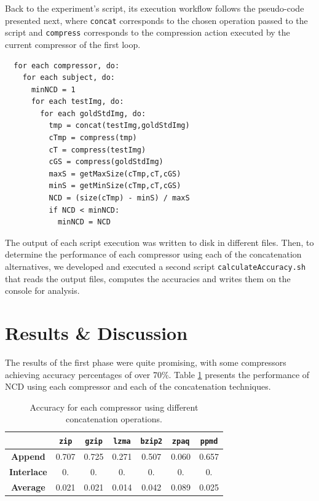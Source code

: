 \documentclass[12pt]{article}
\begin{document}
Back to the experiment's script, its execution workflow follows the pseudo-code presented next, where \texttt{concat} corresponds to the chosen operation passed 
to the script and \texttt{compress} corresponds to the compression action executed by the current compressor of the first loop.

\begin{verbatim}
  for each compressor, do:
    for each subject, do:
      minNCD = 1
      for each testImg, do:
        for each goldStdImg, do:
          tmp = concat(testImg,goldStdImg)
          cTmp = compress(tmp)
          cT = compress(testImg)
          cGS = compress(goldStdImg)
          maxS = getMaxSize(cTmp,cT,cGS)
          minS = getMinSize(cTmp,cT,cGS)
          NCD = (size(cTmp) - minS) / maxS
          if NCD < minNCD:
            minNCD = NCD
\end{verbatim}

\newpage
The output of each script execution was written to disk in different files.
Then, to determine the performance of each compressor using each of the concatenation alternatives, we developed and executed a second script 
\texttt{calculateAccuracy.sh} that reads the output files, computes the accuracies and writes them on the console for analysis. 

\section{Results \& Discussion} %

The results of the first phase were quite promising, with some compressors achieving accuracy percentages of over 70\%.
Table \ref{tab:1} presents the performance of NCD using each compressor and each of the concatenation techniques.

\begin{table}[h!]
\centering
\begin{tabular}{@{}c|cccccc@{}}
                   & \textbf{\texttt{zip}} & \textbf{\texttt{gzip}} & \textbf{\texttt{lzma}} & \textbf{\texttt{bzip2}} & \textbf{\texttt{zpaq}} & \textbf{\texttt{ppmd}}\\ \midrule
\textbf{Append}    & 0.707     & 0.725     & 0.271     & 0.507     & 0.060     & 0.657 \\
\textbf{Interlace} & 0.     & 0.     & 0.     & 0.     & 0.     & 0. \\ 
\textbf{Average}   & 0.021     & 0.021     & 0.014     & 0.042     & 0.089     & 0.025 \\ 
\end{tabular}
\vspace{5pt}
\caption{Accuracy for each compressor using different concatenation operations.}
\label{tab:1}
\end{table}
\end{document}
